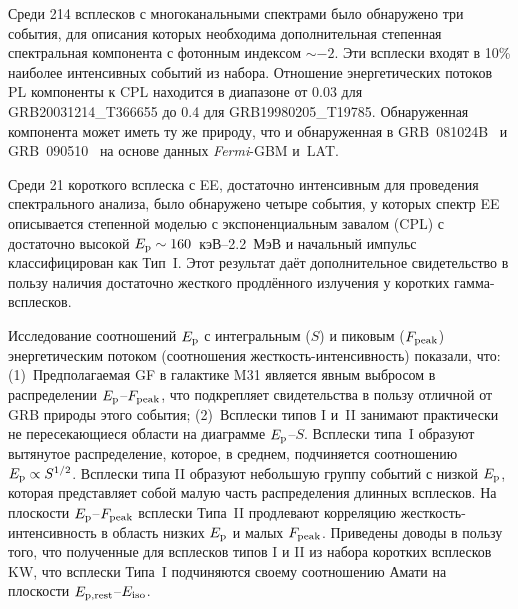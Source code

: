 \begin{enumerate}
    Среди 214 всплесков с многоканальными спектрами было обнаружено три
    события, для описания которых необходима дополнительная степенная 
    спектральная компонента с фотонным индексом $\sim -2$. Эти всплески входят в 10\%
    наиболее интенсивных событий из набора. Отношение энергетических потоков PL
    компоненты к CPL находится в диапазоне от 0.03 для GRB20031214\_T366655 до
    0.4 для GRB19980205\_T19785. Обнаруженная компонента может иметь ту же природу,
    что и обнаруженная в GRB~081024B~\citep{Abdo_2010ApJ_712_558A} и 
    GRB~090510~\citep{Ackermann_2010ApJ_716_1178A} на основе данных \textit{Fermi}-GBM и~LAT.
    
    Среди 21 короткого всплеска с EE, достаточно интенсивным 
    для проведения спектрального анализа, было обнаружено четыре события, у которых 
    спектр EE описывается степенной моделью с экспоненциальным завалом (CPL) 
    с достаточно высокой $E_{\mathrm{p}} \sim 160$~кэВ--2.2~МэВ и начальный импульс 
    классифицирован как Тип~I. Этот результат даёт дополнительное свидетельство 
    в пользу наличия достаточно жесткого продлённого излучения у коротких гамма-всплесков. 
    
    Исследование соотношений $E_{\mathrm{p}}$ с интегральным ($S$) и пиковым ($F_{\mathrm{peak}}$) 
    энергетическим потоком (соотношения жесткость-интенсивность) показали, что:
    (1)~Предполагаемая GF в галактике M31 является явным выбросом в распределении $E_{\mathrm{p}}$--$F_{\mathrm{peak}}$, 
    что подкрепляет свидетельства в пользу отличной от GRB природы этого события;
    (2)~Всплески типов I и~II занимают практически не пересекающиеся области на диаграмме $E_{\mathrm{p}}$--$S$.
    Всплески типа~I образуют вытянутое распределение, которое, в среднем, подчиняется 
    соотношению $E_{\mathrm{p}} \propto S^{1/2}$. Всплески типа II образуют небольшую группу событий
    с низкой $E_{\mathrm{p}}$, которая представляет собой малую часть распределения длинных всплесков.
    На плоскости $E_{\mathrm{p}}$--$F_{\mathrm{peak}}$ всплески Типа~II продлевают корреляцию 
    жесткость-интенсивность в область низких $E_{\mathrm{p}}$ и малых $F_{\mathrm{peak}}$.
    Приведены доводы в пользу того, что полученные для всплесков типов I и II из набора коротких 
    всплесков KW, что всплески Типа~I подчиняются 
    своему соотношению Амати на плоскости $E_{\mathrm{p,rest}}$--$E_{\mathrm{iso}}$.
\end{enumerate}


\clearpage